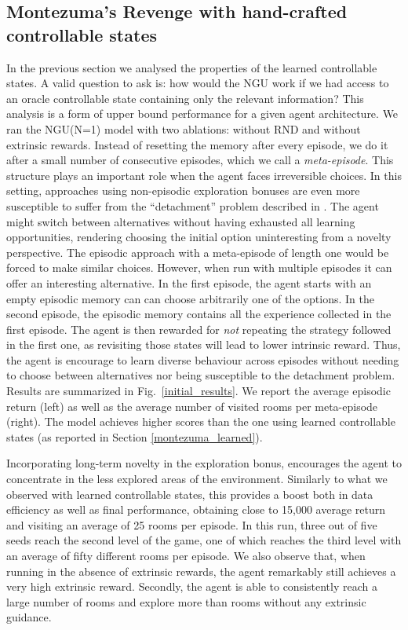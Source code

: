 \documentclass{article} \usepackage{iclr2020_conference,times}
\begin{document}
\subsection{Montezuma's Revenge with hand-crafted controllable states}
\label{montezuma_hand_crafted}
In the previous section we analysed the properties of the learned controllable states. A valid question to ask is: how would the NGU work if we had access to an oracle controllable state containing only the relevant information? This analysis is a form of upper bound performance for a given agent architecture. 
We ran the NGU(N=1) model with two ablations: without RND and without extrinsic rewards.
Instead of resetting the memory after every episode, we do it after a small number of consecutive episodes, which we call a \emph{meta-episode}.
This structure plays an important role when the agent faces irreversible choices.
In this setting, approaches using non-episodic exploration bonuses are even more susceptible to suffer from the ``detachment'' problem described in \citet{ecoffet2019go}. The agent might switch between alternatives without having exhausted all learning opportunities, rendering choosing the initial option uninteresting from a novelty perspective. 
The episodic approach with a meta-episode of length one would be forced to make similar choices. However, when run with multiple episodes it can offer an interesting alternative. In the first episode, the agent starts with an empty episodic memory can can choose arbitrarily one of the options. In the second episode, the episodic memory contains all the experience collected in the first episode. The agent is then rewarded for \emph{not} repeating the strategy followed in the first one, as revisiting those states will lead to lower intrinsic reward. Thus, the agent is encourage to learn diverse behaviour across episodes without needing to choose between alternatives nor being susceptible to the detachment problem.
Results are summarized in Fig.~\ref{initial_results}. We report the average episodic return (left) as well as the average number of visited rooms per meta-episode (right).
The model achieves higher scores than the one using learned controllable states (as reported in Section \ref{montezuma_learned}).


Incorporating long-term novelty in the exploration bonus, encourages the agent to concentrate in the less explored areas of the environment. Similarly to what we observed with learned controllable states, this provides a boost both in data efficiency as well as final performance, obtaining close to 15,000 average return and visiting an average of 25 rooms per episode. In this run, three out of five seeds reach the second level of the game, one of which reaches the third level with an average of fifty different rooms per episode.
We also observe that, when running in the absence of extrinsic rewards, the agent remarkably still achieves a very high extrinsic reward. Secondly, the agent is able to consistently reach a large number of rooms and explore more than  rooms without any extrinsic guidance.
\end{document}
